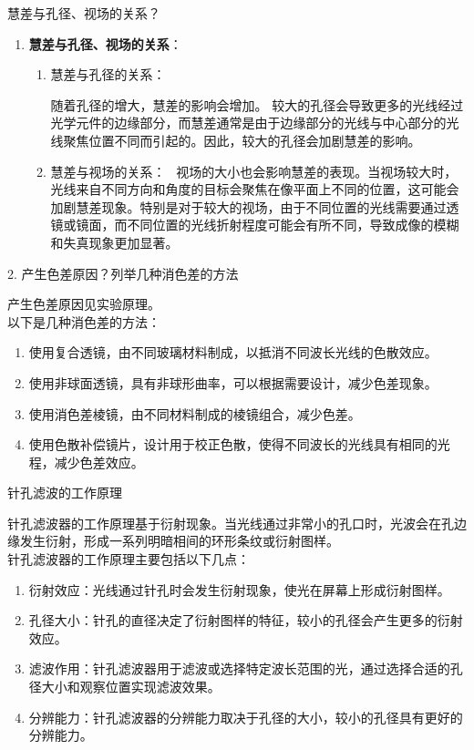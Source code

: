 \documentclass[dvipsnames, svgnames,a4paper,11pt]{article}
\begin{document}
	\begin{question}
		慧差与孔径、视场的关系？
	\end{question}
	\begin{enumerate}
		\item \textbf{慧差与孔径、视场的关系}：
		\begin{enumerate}
			\item 慧差与孔径的关系：
		
				随着孔径的增大，慧差的影响会增加。
				较大的孔径会导致更多的光线经过光学元件的边缘部分，而慧差通常是由于边缘部分的光线与中心部分的光线聚焦位置不同而引起的。因此，较大的孔径会加剧慧差的影响。
			
			
			\item 慧差与视场的关系：
			\
				视场的大小也会影响慧差的表现。当视场较大时，光线来自不同方向和角度的目标会聚焦在像平面上不同的位置，这可能会加剧慧差现象。特别是对于较大的视场，由于不同位置的光线需要通过透镜或镜面，而不同位置的光线折射程度可能会有所不同，导致成像的模糊和失真现象更加显著。
			
		\end{enumerate}
	\end{enumerate}
	
	\begin{question}
		2.	产生色差原因？列举几种消色差的方法
	\end{question}
	产生色差原因见实验原理。\\
	以下是几种消色差的方法：
\begin{enumerate}
    \item 使用复合透镜，由不同玻璃材料制成，以抵消不同波长光线的色散效应。
    \item 使用非球面透镜，具有非球形曲率，可以根据需要设计，减少色差现象。
    \item 使用消色差棱镜，由不同材料制成的棱镜组合，减少色差。
    \item 使用色散补偿镜片，设计用于校正色散，使得不同波长的光线具有相同的光程，减少色差效应。
\end{enumerate}
	\begin{question}
		针孔滤波的工作原理
	\end{question}
	针孔滤波器的工作原理基于衍射现象。当光线通过非常小的孔口时，光波会在孔边缘发生衍射，形成一系列明暗相间的环形条纹或衍射图样。\\

针孔滤波器的工作原理主要包括以下几点：
\begin{enumerate}
    \item 衍射效应：光线通过针孔时会发生衍射现象，使光在屏幕上形成衍射图样。
    \item 孔径大小：针孔的直径决定了衍射图样的特征，较小的孔径会产生更多的衍射效应。
    \item 滤波作用：针孔滤波器用于滤波或选择特定波长范围的光，通过选择合适的孔径大小和观察位置实现滤波效果。
    \item 分辨能力：针孔滤波器的分辨能力取决于孔径的大小，较小的孔径具有更好的分辨能力。
\end{enumerate}
\end{document}
